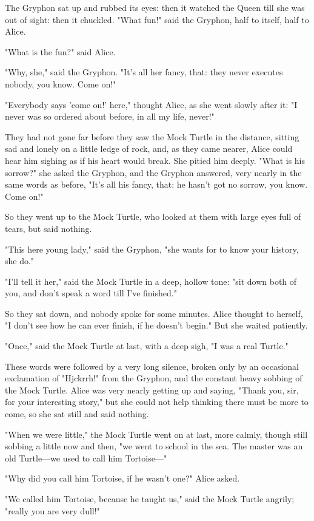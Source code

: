 The Gryphon sat up and rubbed its eyes: then it watched the Queen till she was out of sight: then it chuckled. "What fun!" said the Gryphon, half to itself, half to Alice.

"What is the fun?" said Alice.

"Why, she," said the Gryphon. "It's all her fancy, that: they never executes nobody, you know. Come on!"

"Everybody says 'come on!' here," thought Alice, as she went slowly after it: "I never was so ordered about before, in all my life, never!"

They had not gone far before they saw the Mock Turtle in the distance, sitting sad and lonely on a little ledge of rock, and, as they came nearer, Alice could hear him sighing as if his heart would break. She pitied him deeply. "What is his sorrow?" she asked the Gryphon, and the Gryphon answered, very nearly in the same words as before, "It's all his fancy, that: he hasn't got no sorrow, you know. Come on!"

​So they went up to the Mock Turtle, who looked at them with large eyes full of tears, but said nothing.

"This here young lady," said the Gryphon, "she wants for to know your history, she do."

"I'll tell it her," said the Mock Turtle in a deep, hollow tone: "sit down both of you, and don't speak a word till I've finished."

So they sat down, and nobody spoke for some minutes. Alice thought to herself, "I don't see how he can ever finish, if he doesn't begin." But she waited patiently.

"Once," said the Mock Turtle at last, with a deep sigh, "I was a real Turtle."

These words were followed by a very long silence, broken only by an occasional exclamation of "Hjckrrh!" from the Gryphon, and the constant heavy sobbing of the Mock Turtle. Alice was very nearly getting up and saying, "Thank you, sir, for your interesting story," but she could not help thinking there must be more to come, so she sat still and said nothing.

"When we were little," the Mock Turtle went on at last, more calmly, though still sobbing a little now and then, "we went to school ​in the sea. The master was an old Turtle—we used to call him Tortoise—"

"Why did you call him Tortoise, if he wasn't one?" Alice asked.

"We called him Tortoise, because he taught us," said the Mock Turtle angrily; "really you are very dull!"

